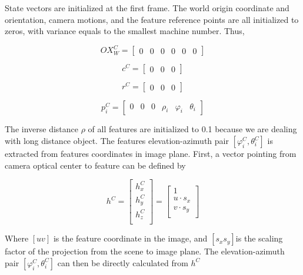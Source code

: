 State vectors are initialized at the first frame. The world origin 
coordinate and orientation, camera motions, and the feature reference 
points are all initialized to zeros, with variance equals to the 
smallest machine number. Thus, 

\begin{equation}
OX_{W}^{C}=\begin{bmatrix}0&0&0&0&0&0\end{bmatrix} 
\end{equation}

\begin{equation}
c^{C}=\begin{bmatrix}0&0&0\end{bmatrix}
\end{equation}

\begin{equation}
r^{C}=\begin{bmatrix}0&0&0\end{bmatrix}
\end{equation}

\begin{equation}
p_{i}^{C}=\begin{bmatrix}0&0&0&\rho _{i}&\varphi_{i}&\theta_{i}\end{bmatrix}
\end{equation}

The inverse distance $\rho $ of all features are initialized to 0.1 
because we are dealing with long distance object. The features 
elevation-azimuth pair $[\varphi _{i}^{C}, \theta _{i}^{C}]$ is 
extracted from features coordinates in image plane. First, a vector 
pointing from camera optical center to feature can be defined by

\begin{equation}
h^{C}=\begin{bmatrix}
h_{x}^{C}\\
h_{y}^{C}\\
h_{z}^{C}\\
\end{bmatrix}
 = \begin{bmatrix}
1 \\
u\cdot s_{x} \\
v\cdot s_{y} \\
\end{bmatrix}
\end{equation}

Where $[u v]$ is the feature coordinate in the image, and $
[s_{x}s_{y}] $is the scaling factor of the projection from the scene to 
image plane. The elevation-azimuth pair $[\varphi _{i}^{C}, \theta 
_{i}^{C}]$ can then be directly calculated from $h^{C}$

